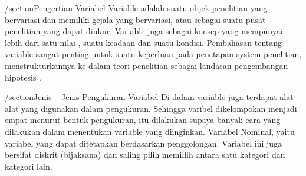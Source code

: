 

/section{Pengertian Variabel}
Variable adalah suatu objek penelitian yang bervariasi dan memiliki gejala yang 
bervariasi, atau sebagai suatu pusat penelitian yang dapat diukur. Variable juga 
sebagai konsep yang mempunyai  lebih dari satu nilai , suatu keadaan dan suatu kondisi.
Pembahasan tentang variable sangat  penting  untuk suatu keperluan pada penetapan system
penelitian, menstrukturkannya ke dalam teori penelitian sebagai landasan pengembangan 
hipotesis .  

/section{Jenis – Jenis Pengukuran Variabel}
Di dalam variable juga terdapat alat alat yang digunakan dalam pengukuran. Sehingga varibel dikelompokan menjadi empat menurut bentuk   
pengukuran, itu dilakukan supaya banyak cara yang dilakukan dalam menentukan variable yang diinginkan. Variabel Nominal, yaitu variabel
yang dapat ditetapkan berdasarkan penggolongan. Variabel ini juga bersifat diskrit (bijaksana) dan saling pilih memillih antara satu 
kategori dan kategori lain.


